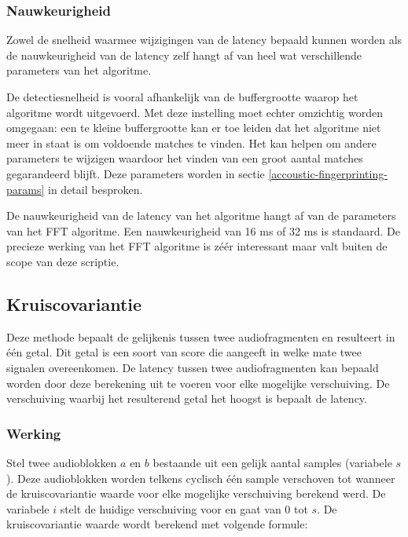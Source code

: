 \subsubsection{Nauwkeurigheid}

Zowel de snelheid waarmee wijzigingen van de latency bepaald kunnen worden als de nauwkeurigheid van de latency zelf hangt af van heel wat verschillende parameters van het algoritme.

De detectiesnelheid is vooral afhankelijk van de buffergrootte waarop het algoritme wordt uitgevoerd. Met deze instelling moet echter omzichtig worden omgegaan: een te kleine buffergrootte kan er toe leiden dat het algoritme niet meer in staat is om voldoende matches te vinden. Het kan helpen om andere parameters te wijzigen waardoor het vinden van een groot aantal matches gegarandeerd blijft. Deze parameters worden in sectie \ref{accoustic-fingerprinting-params} in detail besproken.

De nauwkeurigheid van de latency van het algoritme hangt af van de parameters van het FFT algoritme. Een nauwkeurigheid van 16 ms of 32 ms is standaard. De precieze werking van het FFT algoritme is zéér interessant maar valt buiten de scope van deze scriptie.

\subsection{Kruiscovariantie}
\label{kruiscovariantie}

Deze methode bepaalt de gelijkenis tussen twee audiofragmenten en resulteert in één getal. Dit getal is een soort van score die aangeeft in welke mate twee signalen overeenkomen. De latency tussen twee audiofragmenten kan bepaald worden door deze berekening uit te voeren voor elke mogelijke verschuiving. De verschuiving waarbij het resulterend getal het hoogst is bepaalt de latency.

\subsubsection{Werking}

Stel twee audioblokken $ a $ en $ b $ bestaande uit een gelijk aantal samples (variabele $s$). Deze audioblokken worden telkens cyclisch één sample verschoven tot wanneer de kruiscovariantie waarde voor elke mogelijke verschuiving berekend werd. De variabele $ i $ stelt de huidige verschuiving voor en gaat van 0 tot $ s $. De kruiscovariantie waarde wordt berekend met volgende formule:


